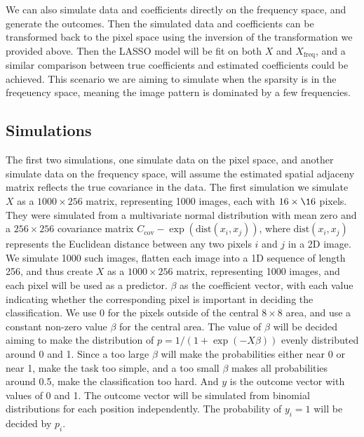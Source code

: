\documentclass[12pt]{article}
\begin{document}
We can also simulate data and coefficients directly on the frequency space, and generate the outcomes. Then the simulated data and coefficients can be transformed back to the pixel space using the inversion of the transformation we provided above. Then the LASSO model will be fit on both \( X \) and \( X_{\text{freq}} \), and a similar comparison between true coefficients and estimated coefficients could be achieved. This scenario we are aiming to simulate when the sparsity is in the freqeuency space, meaning the image pattern is dominated by a few frequencies.


\subsection{Simulations}

The first two simulations, one simulate data on the pixel space, and another simulate data on the frequency space, will assume the estimated spatial adjaceny matrix reflects the true covariance in the data. The first simulation we simulate \( X \) as a \( 1000 \times 256 \) matrix, representing 1000 images, each with \( 16 \times \16 \) pixels. They were simulated from a multivariate normal distribution with mean zero and a \( 256 \times 256 \) covariance matrix \( C_{\text{cov}} - \exp (\text{dist} (x_i, x_j )) \), where \( \text{dist}(x_i, x_j) \) represents the Euclidean distance between any two pixels \( i \) and \( j \) in a 2D image. We simulate 1000 such images, flatten each image into a 1D sequence of length 256, and thus create \( X \) as a \( 1000 \times 256 \) matrix, representing 1000 images, and each pixel will be used as a predictor. \( \beta \) as the coefficient vector, with each value indicating whether the corresponding pixel is important in deciding the classification. We use 0 for the pixels outside of the central \( 8 \times 8 \) area, and use a constant non-zero value \( \beta \) for the central area. The value of \( \beta \) will be decided aiming to make the distribution of \( p = 1 / (1 + \exp (- X \beta)) \) evenly distributed around 0 and 1. Since a too large \( \beta \) will make the probabilities either near 0 or near 1, make the task too simple, and a too small \( \beta \) makes all probabilities around 0.5, make the classification too hard.
And \( y \) is the outcome vector with values of 0 and 1. The outcome vector will be simulated from binomial distributions for each position independently. The probability of \( y_i = 1 \) will be decided by \( p_i \).
\end{document}
